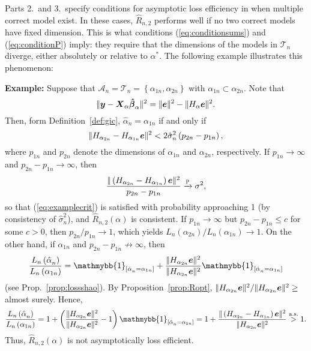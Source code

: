 \documentclass[11pt, letter paper]{article}
\newcommand{\1}{\mathmybb{1}}
\newcommand{\0}{\emptyset}
\newcommand{\prob}{\mathbb{P}}
\newcommand{\paren}[1]{\left(#1 \right)}
\newcommand{\sqbr}[1]{\left[#1 \right]}
\newcommand{\set}[1]{\left\{ #1 \right\}}
\newcommand{\norm}[1]{|\hspace{-1pt}|#1 |\hspace{-1pt}|}
\newcommand{\normsq}[1]{\norm{#1}^{2}}
\newcommand{\ind}[1]{\mathmybb{1}_{\sqbr{#1}}}
\newcommand{\Acal}{\mathcal{A}_{n}}
\newcommand{\Tcal}{\mathcal{T}_{n}}
\newcommand{\X}{\boldsymbol{X}}
\newcommand{\y}{\boldsymbol{y}}
\newcommand{\e}{\boldsymbol{e}}
\newcommand{\bbetahat}{\boldsymbol{\hat{\beta}}}
\newcommand{\Loss}[1]{L_{n}\paren{#1}}
\newcommand{\Rhat}[2]{\hat{R}_{n, #1}\paren{#2}}
\newcommand{\alphahat}[1]{\hat{\alpha}^{#1}}
\newcommand{\sigmahat}{\hat{\sigma}^{2}_{n}}
\begin{document}
Parts 2.\ and 3.\ specify conditions for asymptotic loss efficiency in when multiple correct model exist. In these cases, \(\hat{R}_{n,2}\) performs well if no two correct models have fixed dimension. This is what conditions (\ref{eq:conditionsums}) and (\ref{eq:conditionP}) imply: they require that the dimensions of the models in \(\Tcal\) diverge, either absolutely or relative to \(\alpha^{*}\). The following example illustrates this phenomenon:

\begin{myproofbox}
    \textbf{Example:} Suppose that \(\Acal = \Tcal = \set{\alpha_{1n}, \alpha_{2n}}\) with \(\alpha_{1n}\subset\alpha_{2n}\). Note that 
    \[\normsq{\y - \X_{\alpha}\bbetahat_{\alpha}} = \normsq{\e} - \normsq{H_{\alpha}\e}.\]
    Then, form Definition~\ref{def:gic}, \(\alphahat{}_{n} = \alpha_{1n}\) if and only if
    \begin{equation}\label{eq:examplecrit}
    \normsq{H_{\alpha_{2n}} - H_{\alpha_{1n}}\e} < 2\sigmahat\paren{p_{2n}-p_{1n}},
    \end{equation}
    where \(p_{1n}\) and \(p_{2n}\) denote the dimensions of \(\alpha_{1n}\) and \(\alpha_{2n}\), respectively. If \(p_{1n}\to\infty\) and \(p_{2n} - p_{1n}\to\infty\), then
    \[\frac{\normsq{\paren{H_{\alpha_{2n}} - H_{\alpha_{1n}}}\e}}{p_{2n} - p_{1n}}\xrightarrow{\prob}\sigma^{2},\]
    so that (\ref{eq:examplecrit}) is satisfied with probability approaching 1 (by consistency of \(\sigmahat\)), and \(\Rhat{2}{\alpha}\) is consistent. If \(p_{1n}\to\infty\) but \(p_{2n} - p_{1n}\leq c\) for some \(c>0\), then \(p_{2n} / p_{1n}\to 1\), which yields \(\Loss{\alpha_{2n}}/\Loss{\alpha_{1n}} \to 1\). On the other hand, if \(\alpha_{1n}\) and \(p_{2n} - p_{1n}\not\to\infty\), then
    \[\frac{\Loss{\alphahat{}_{n}}}{\Loss{\alpha_{1n}}} = \ind{\alphahat{}_{n}=\alpha_{1n}} + \frac{\normsq{H_{\alpha_{2n}}\e}}{\normsq{H_{\alpha_{2n}}\e}}\ind{\alphahat{}_{n}=\alpha_{1n}}\]
    (see Prop.~\ref{prop:lossshao}). By Proposition~\ref{prop:Ropt}, \({\normsq{H_{\alpha_{2n}}\e}}/{\normsq{H_{\alpha_{2n}}\e}}\geq\) almost surely. Hence,
    \[\frac{\Loss{\alphahat{}_{n}}}{\Loss{\alpha_{1n}}} = 1 + \paren{\frac{\normsq{H_{\alpha_{2n}}\e}}{\normsq{H_{\alpha_{2n}}\e}} - 1}\ind{\alphahat{}_{n}=\alpha_{1n}} = 1 + \frac{\normsq{\paren{H_{\alpha_{2n}} - H_{\alpha_{1n}}}\e}}{\normsq{H_{\alpha_{2n}}\e}} \stackrel{\mathrm{a.s.}}{>} 1.\]
    Thus, \(\Rhat{2}{\alpha}\) is not asymptotically loss efficient.    
\end{myproofbox}
\end{document}
